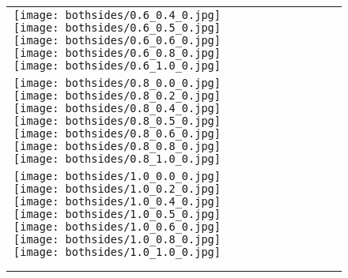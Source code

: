 \documentclass[10pt,twocolumn,letterpaper]{article}
\begin{document}
\begin{figure}[tb!]
{\begin{tabular}{c c c c c c c c c c}
  \texttt{[image: bothsides/0.6\_0.4\_0.jpg]}
  \texttt{[image: bothsides/0.6\_0.5\_0.jpg]}
  \texttt{[image: bothsides/0.6\_0.6\_0.jpg]}
  \texttt{[image: bothsides/0.6\_0.8\_0.jpg]}
  \texttt{[image: bothsides/0.6\_1.0\_0.jpg]}
\tabularnewline
    \raisebox{0.1in}{\rotatebox{90}{\small \emph{}
 }}
  \texttt{[image: bothsides/0.8\_0.0\_0.jpg]}
  \texttt{[image: bothsides/0.8\_0.2\_0.jpg]}
   \texttt{[image: bothsides/0.8\_0.4\_0.jpg]}
  \texttt{[image: bothsides/0.8\_0.5\_0.jpg]}
  \texttt{[image: bothsides/0.8\_0.6\_0.jpg]}
  \texttt{[image: bothsides/0.8\_0.8\_0.jpg]}
  \texttt{[image: bothsides/0.8\_1.0\_0.jpg]}
\tabularnewline
    \raisebox{0.1in}{\rotatebox{90}{\small \emph{}
 }}
  \texttt{[image: bothsides/1.0\_0.0\_0.jpg]}
  \texttt{[image: bothsides/1.0\_0.2\_0.jpg]}
   \texttt{[image: bothsides/1.0\_0.4\_0.jpg]}
  \texttt{[image: bothsides/1.0\_0.5\_0.jpg]}
  \texttt{[image: bothsides/1.0\_0.6\_0.jpg]}
  \texttt{[image: bothsides/1.0\_0.8\_0.jpg]}
  \texttt{[image: bothsides/1.0\_1.0\_0.jpg]}
    \tabularnewline
        \raisebox{0.1in}{\rotatebox{90}{
 }}
 \hspace{0.5mm}

  \tabularnewline
\vspace{2mm}
\vspace{-2\baselineskip}
\end{tabular}}
\vspace{-0.8cm}
\hspace{20pt}
\label{fig:glideablation1}
\vspace{-2mm}
\end{figure} 
\end{document}
